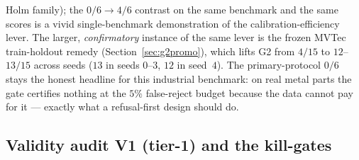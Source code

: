 \documentclass[11pt]{article}
\begin{document}
Holm family); the $0/6 \to 4/6$ contrast on the same benchmark and the same scores is a vivid
single-benchmark demonstration of the calibration-efficiency lever. The larger, \emph{confirmatory}
instance of the same lever is the frozen MVTec train-holdout remedy (Section~\ref{sec:g2promo}),
which lifts G2 from $4/15$ to $12$--$13/15$ across seeds ($13$ in seeds $0$--$3$, $12$ in seed~$4$).
The primary-protocol $0/6$ stays the honest headline for this industrial benchmark: on real metal
parts the gate certifies nothing at the $5\%$ false-reject budget because the data cannot pay for
it --- exactly what a refusal-first design should do.

\subsection{Validity audit V1 (tier-1) and the kill-gates}
\label{sec:v1res}
\end{document}
